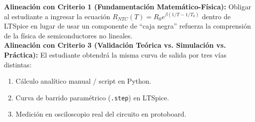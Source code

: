 \documentclass[11pt,a4paper]{article}
\newcommand{\spice}[1]{\texttt{\color{purple}#1}}
\begin{document}
\vspace{0.5cm}
\begin{justificacion}
\textbf{Alineación con Criterio 1 (Fundamentación Matemático-Física):} Obligar al estudiante a ingresar la ecuación $R_{NTC}(T) = R_0 e^{\beta (1/T - 1/T_0)}$ dentro de LTSpice en lugar de usar un componente de ``caja negra'' refuerza la comprensión de la física de semiconductores no lineales.\\

\textbf{Alineación con Criterio 3 (Validación Teórica vs. Simulación vs. Práctica):} El estudiante obtendrá la misma curva de salida por tres vías distintas:
\begin{enumerate}
    \item Cálculo analítico manual / script en Python.
    \item Curva de barrido paramétrico (\spice{.step}) en LTSpice.
    \item Medición en osciloscopio real del circuito en protoboard.
\end{enumerate}
\end{justificacion}
\end{document}
